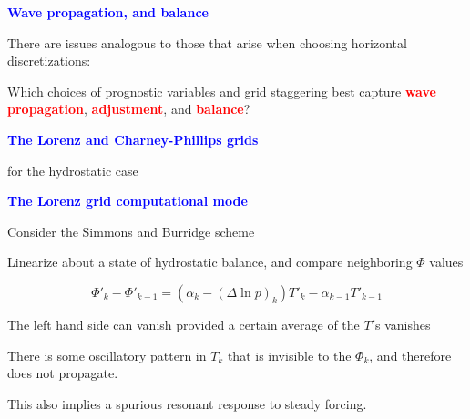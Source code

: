 \documentclass[a4]{seminar}
\newcommand{\R}[1]{\textcolor{red}{#1}}
\newcommand{\B}[1]{\textcolor{blue}{#1}}
\begin{document}

\begin{slide}

\B{\bf Wave propagation, and balance}

\vspace{4mm}

There are issues analogous to those that arise when choosing
horizontal discretizations:

Which choices of prognostic variables
and grid staggering best capture \R{\bf wave propagation},
\R{\bf adjustment}, and \R{\bf balance}?



\end{slide}


\begin{slide}

\B{\bf The Lorenz and Charney-Phillips grids}

for the hydrostatic case

\begin{center}
\end{center}


\end{slide}


\begin{slide}

\B{\bf The Lorenz grid computational mode}

\vspace{2mm}

Consider the Simmons and Burridge scheme

Linearize about a state of hydrostatic balance, and
compare neighboring \( \Phi \) values

\begin{displaymath}
\Phi'_{k} - \Phi'_{k-1}
=
( \alpha_k - ( \Delta \ln p)_k) T'_k - \alpha_{k-1} T'_{k-1}
\end{displaymath}

\vspace{2mm}

The left hand side can vanish provided a certain average of the
\( T' \)s vanishes

\vspace{2mm}

There is some oscillatory pattern in \( T_k \) that is invisible
to the \( \Phi_k \), and therefore does not propagate.

This also implies a spurious resonant response to steady forcing.


\end{slide}
\end{document}
